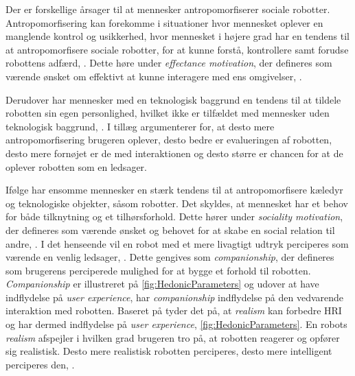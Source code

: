Der er forskellige årsager til at mennesker antropomorfiserer sociale robotter. Antropomorfisering kan forekomme i situationer hvor mennesket oplever en manglende kontrol og usikkerhed, hvor mennesket i højere grad har en tendens til at antropomorfisere sociale robotter, for at kunne forstå, kontrollere samt forudse robottens adfærd, \parencite[s. 1478]{PDF:ExploringInfluencingVariable}. Dette høre under \textit{effectance motivation}, der defineres som værende ønsket om effektivt at kunne interagere med ens omgivelser, \parencite[s. 62]{PDF:EffectsOfAnticipatedHRI}.

Derudover har mennesker med en teknologisk baggrund en tendens til at tildele robotten sin egen personlighed, hvilket ikke er tilfældet med mennesker uden teknologisk baggrund, \parencite[s. 19]{PDF:CloseButNotStuck}. I tillæg argumenterer \textcite[s. 2]{PDF:SharingALifeHarvey} for, at desto mere antropomorfisering brugeren oplever, desto bedre er evalueringen af robotten, desto mere fornøjet er de med interaktionen og desto større er chancen for at de oplever robotten som en ledsager.

Ifølge \textcite[s. 61]{PDF:EffectsOfAnticipatedHRI} har ensomme mennesker en stærk tendens til at antropomorfisere kæledyr og teknologiske objekter, såsom robotter. Det skyldes, at mennesket har et behov for både tilknytning og et tilhørsforhold. Dette hører under \textit{sociality motivation}, der defineres som værende ønsket og behovet for at skabe en social relation til andre, \parencite[s. 61]{PDF:EffectsOfAnticipatedHRI}. I det henseende vil en robot med et mere livagtigt udtryk perciperes som værende en venlig ledsager, \parencite[s. 1478]{PDF:ExploringInfluencingVariable}. Dette gengives som \textit{companionship}, der defineres som brugerens perciperede mulighed for at bygge et forhold til robotten. \textit{Companionship} er illustreret på \autoref{fig:HedonicParameters} og udover at have indflydelse på \textit{user experience}, har \textit{companionship} indflydelse på den vedvarende interaktion med robotten. \blankline
%
Baseret på \textcite[s. 1478]{PDF:ExploringInfluencingVariable} tyder det på, at \textit{realism} kan forbedre HRI og har dermed indflydelse på \textit{user experience}, \autoref{fig:HedonicParameters}. En robots \textit{realism} afspejler i hvilken grad brugeren tro på, at robotten reagerer og opfører sig realistisk. Desto mere realistisk robotten perciperes, desto mere intelligent perciperes den, \parencite[s. 1478]{PDF:ExploringInfluencingVariable}. 

